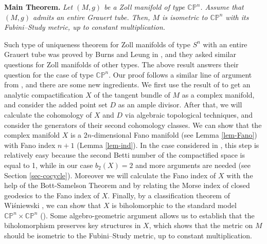 \documentclass[a4paper, 12pt]{article}
\newcommand{\oX}{X}
\newcommand{\bC}{\mathbb{C}}
\newcommand{\bCP}{\mathbb{CP}^n}
\newcommand{\bP}{\mathbb{P}}
\newtheorem{thm}{Theorem}[section]
\begin{document}


\medskip
\noindent\textbf{Main Theorem.}
\textit{Let $(M,g)$ be a Zoll manifold of type $\bCP$. Assume that $(M, g)$ admits an entire Grauert tube. Then, $M$ is isometric to $\bCP$ with its Fubini--Study metric, up to constant multiplication.}
\medskip
 
Such type of uniqueness theorem for Zoll manifolds of type $S^n$ with an entire Grauert tube was proved by Burns and Leung in \cite{BL18}, and they asked similar questions for Zoll manifolds of other types. The above result answers their question for the case of type $\bCP$. Our proof follows a similar line of argument from \cite{BL18}, and there are some new ingredients. We first use the result of \cite{BL18} to get an analytic compactification $\oX$ of the tangent bundle of $M$ as a complex manifold, and consider the added point set $D$ as an ample divisor. After that, we will calculate the cohomology of $\oX$ and $D$ via algebraic topological techniques, and consider the generators of their second cohomology classes. 
We can show that the complex manifold $\oX$ is a $2n$-dimensional Fano manifold (see Lemma \ref{lem-Fano}) with Fano index $n+1$ (Lemma \ref{lem-ind}). 
In the case considered in \cite{BL18}, this step is relatively easy because the second Betti number of the compactified space is equal to 1, while in our case $b_2(\oX)=2$ and more arguments are needed (see Section \ref{sec-cocycle}). Moreover we will calculate the Fano index of $\oX$ with the help of the Bott-Samelson Theorem and by relating the Morse index of closed geodesics to the Fano index of $\oX$. Finally, by a classification theorem of Wiśniewski \cite{W90}, we can show that $\oX$ is biholomorphic to the standard model $\bC\bP^n\times \bC\bP^n$ (\cite{PW91}). Some algebro-geometric argument allows us to establish that the biholomorphism preserves key structures in $\oX$, which shows that the metric on $M$ should be isometric to the Fubini--Study metric, up to constant multiplication.
\end{document}
